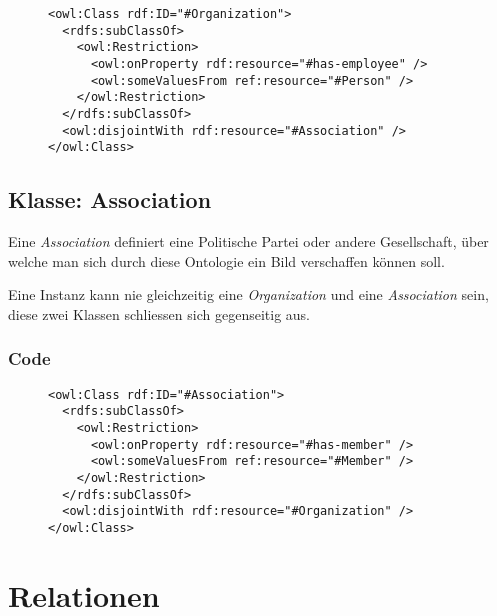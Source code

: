 \documentclass[
    11pt,
    latin1,
    a4paper,
    oneside
]{scrreprt}
\begin{document}
\begin{figure}[h]
 \lstset{language=XML}
 \begin{lstlisting}[label=owl:organization,caption={Die Klasse \emph{Organization} definiert einen Arbeitgeben, meistens ein Medienhaus}]
<owl:Class rdf:ID="#Organization">
  <rdfs:subClassOf>
    <owl:Restriction>
      <owl:onProperty rdf:resource="#has-employee" />
      <owl:someValuesFrom ref:resource="#Person" />
    </owl:Restriction>
  </rdfs:subClassOf>
  <owl:disjointWith rdf:resource="#Association" />
</owl:Class>
 \end{lstlisting}
\end{figure}


\subsection{Klasse: Association} \label{sec:class_association}

Eine \emph{Association} definiert eine Politische Partei oder andere Gesellschaft, \"uber welche man sich durch diese Ontologie ein Bild verschaffen k\"onnen soll.

Eine Instanz kann nie gleichzeitig eine \emph{Organization} und eine \emph{Association} sein, diese zwei Klassen schliessen sich gegenseitig aus.

\subsubsection{Code} \label{sec:class_association_code}

\begin{figure}[h]
 \lstset{language=XML}
 \begin{lstlisting}[label=owl:association,caption={Eine \emph{Association} ist eine politische Partei oder eine andere Gesellschaft}]
<owl:Class rdf:ID="#Association">
  <rdfs:subClassOf>
    <owl:Restriction>
      <owl:onProperty rdf:resource="#has-member" />
      <owl:someValuesFrom ref:resource="#Member" />
    </owl:Restriction>
  </rdfs:subClassOf>
  <owl:disjointWith rdf:resource="#Organization" />
</owl:Class>
 \end{lstlisting}
\end{figure}



\section{Relationen} \label{sec:reltations}
\end{document}
